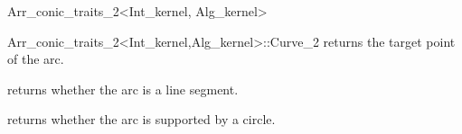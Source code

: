 \begin{ccRefClass}{Arr_conic_traits_2<Int_kernel, Alg_kernel>}
\begin{ccClass}{Arr_conic_traits_2<Int_kernel,Alg_kernel>::Curve_2}
  {returns the target point of the arc.}


  {returns whether the arc is a line segment.}

  {returns whether the arc is supported by a circle.} 


\end{ccClass}

\end{ccRefClass} %

\ccRefPageEnd
